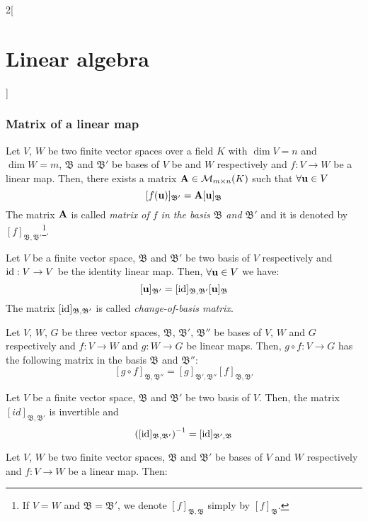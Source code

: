 \documentclass[../../../main.tex]{subfiles}
\begin{document}
\begin{multicols}{2}[\section{Linear algebra}]
  \subsubsection*{Matrix of a linear map}
  \begin{prop}
    Let $V$, $W$ be two finite vector spaces over a field $K$ with $\dim V=n$ and $\dim W=m$, $\mathfrak{B}$ and $\mathfrak{B}'$ be bases of $V$ be and $W$ respectively and $f:V\rightarrow W$ be a linear map. Then, there exists a matrix $\vb{A}\in\mathcal{M}_{m\times n}(K)$ such that $\forall\vb{u}\in V$ $$[f(\vb{u})]_{\mathfrak{B}'}=\vb{A}[\vb{u}]_\mathfrak{B}$$
    The matrix $\vb{A}$ is called \textit{matrix of $f$ in the basis $\mathfrak{B}$ and $\mathfrak{B}'$} and it is denoted by $[f]_{\mathfrak{B},\mathfrak{B}'}$\footnote{If $V=W$ and $\mathfrak{B}=\mathfrak{B}'$, we denote $[f]_{\mathfrak{B},\mathfrak{B}}$ simply by $[f]_{\mathfrak{B}}$.}.
  \end{prop}
  \begin{corollary}
    Let $V$ be a finite vector space, $\mathfrak{B}$ and $\mathfrak{B}'$ be two basis of $V$ respectively and $\mathrm{id}:V\rightarrow V$ be the identity linear map. Then, $\forall\vb{u}\in V$ we have: $$[\vb{u}]_{\mathfrak{B}'}=[\mathrm{id}]_{\mathfrak{B},\mathfrak{B}'}[\vb{u}]_\mathfrak{B}$$ The matrix $[\mathrm{id}]_{\mathfrak{B},\mathfrak{B}'}$ is called \textit{change-of-basis matrix}.
  \end{corollary}
  \begin{prop}
    Let $V$, $W$, $G$ be three vector spaces, $\mathfrak{B}$, $\mathfrak{B}'$, $\mathfrak{B}''$ be bases of $V$, $W$ and $G$ respectively and $f:V\rightarrow W$ and $g:W\rightarrow G$ be linear maps. Then, $g\circ f:V\rightarrow G$ has the following matrix in the basis $\mathfrak{B}$ and $\mathfrak{B}''$: $$[g\circ f]_{\mathfrak{B},\mathfrak{B}''}=[g]_{\mathfrak{B}',\mathfrak{B}''}[f]_{\mathfrak{B},\mathfrak{B}'}$$
  \end{prop}
  \begin{corollary}
    Let $V$ be a finite vector space, $\mathfrak{B}$ and $\mathfrak{B}'$ be two basis of $V$. Then, the matrix $[id]_{\mathfrak{B},\mathfrak{B}'}$ is invertible and $${\left([\mathrm{id}]_{\mathfrak{B},\mathfrak{B}'}\right)}^{-1}=[\mathrm{id}]_{\mathfrak{B}',\mathfrak{B}}$$
  \end{corollary}
  \begin{corollary}
    Let $V$, $W$ be two finite vector spaces, $\mathfrak{B}$ and $\mathfrak{B}'$ be bases of $V$ and $W$ respectively and $f:V\rightarrow W$ be a linear map. Then:

\end{corollary}
\end{multicols}
\end{document}

